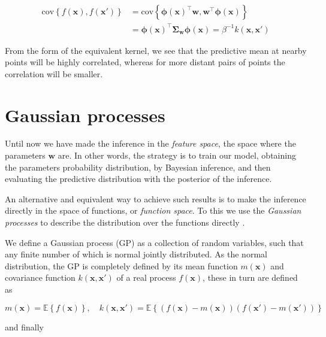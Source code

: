 \documentclass[11pt]{article} %
\begin{document}
\begin{equation}
   \begin{aligned}
      \mathrm{cov}\left\{ f(\mathbf{x}), f(\mathbf{x'})\right\} &=\mathrm{cov} \left\{ \boldsymbol{\phi}(\mathbf{x})^\top \mathbf{w}, \mathbf{w}^\top \boldsymbol{\phi}(\mathbf{x}) \right\} \\
       &= \boldsymbol{\phi}(\mathbf{x})^\top \boldsymbol{\Sigma}_\mathbf{w}\boldsymbol{\phi}(\mathbf{x}) = \beta^{-1}k(\mathbf{x},\mathbf{x'})
   \end{aligned}
\end{equation}

From the form of the equivalent kernel, we see that the predictive mean at nearby points will be highly correlated, whereas for more distant pairs of points the correlation will be smaller.

\section{Gaussian processes}

Until now we have made the inference in the \textit{feature space}, the space where the parameters $\mathbf{w}$ are. In other words, the strategy is to train our model, obtaining the parameters probability distribution, by Bayesian inference, and then evaluating the predictive distribution with the posterior of the inference.

An alternative and equivalent way to achieve such results is to make the inference directly in the space of functions, or \textit{function space}. To this we use the \textit{Gaussian processes} to describe the distribution over the functions directly \cite{Rasmussen:2005:GPM:1162254}.

We define a Gaussian process (GP) as a collection of random variables, such that any finite number of which is normal jointly distributed. As the normal distribution, the GP is completely defined by its mean function $m(\mathbf{x})$ and covariance function $k(\mathbf{x},\mathbf{x'})$ of a real process $f(\mathbf{x})$, these in turn are defined as

\begin{equation}
   m(\mathbf{x}) = \mathbb{E}\left\{ f(\mathbf{x}) \right\}, \quad
   k(\mathbf{x},\mathbf{x'}) = \mathbb{E}\left\{ \left( f(\mathbf{x}) - m(\mathbf{x}) \right) \left( f(\mathbf{x'}) - m(\mathbf{x'}) \right) \right\}
\end{equation}

and finally
\end{document}
